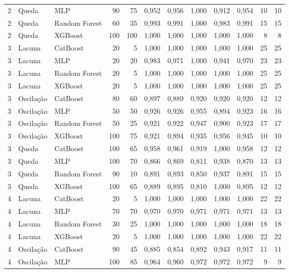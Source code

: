 \begin{longtable}{@{}rllrrrrrrrrr@{}}
2 & Queda & MLP & 90 & 75 & 0,952 & 0,956 & 1,000 & 0,912 & 0,954 & 10 & 10 \\
2 & Queda & Random Forest & 60 & 35 & 0,993 & 0,991 & 1,000 & 0,983 & 0,991 & 15 & 15 \\
2 & Queda & XGBoost & 100 & 100 & 1,000 & 1,000 & 1,000 & 1,000 & 1,000 & 8 & 8 \\
3 & Lacuna & CatBoost & 20 & 5 & 1,000 & 1,000 & 1,000 & 1,000 & 1,000 & 25 & 25 \\
3 & Lacuna & MLP & 20 & 20 & 0,983 & 0,971 & 1,000 & 0,941 & 0,970 & 23 & 23 \\
3 & Lacuna & Random Forest & 20 & 5 & 1,000 & 1,000 & 1,000 & 1,000 & 1,000 & 25 & 25 \\
3 & Lacuna & XGBoost & 20 & 5 & 1,000 & 1,000 & 1,000 & 1,000 & 1,000 & 25 & 25 \\
3 & Oscilação & CatBoost & 80 & 60 & 0,897 & 0,889 & 0,920 & 0,920 & 0,920 & 12 & 12 \\
3 & Oscilação & MLP & 50 & 50 & 0,926 & 0,926 & 0,955 & 0,894 & 0,923 & 16 & 16 \\
3 & Oscilação & Random Forest & 50 & 25 & 0,921 & 0,922 & 0,947 & 0,900 & 0,923 & 17 & 17 \\
3 & Oscilação & XGBoost & 100 & 75 & 0,921 & 0,894 & 0,935 & 0,956 & 0,945 & 10 & 10 \\
3 & Queda & CatBoost & 100 & 65 & 0,958 & 0,961 & 0,919 & 1,000 & 0,958 & 12 & 12 \\
3 & Queda & MLP & 100 & 70 & 0,866 & 0,869 & 0,811 & 0,938 & 0,870 & 13 & 13 \\
3 & Queda & Random Forest & 90 & 10 & 0,891 & 0,893 & 0,850 & 0,937 & 0,891 & 15 & 15 \\
3 & Queda & XGBoost & 100 & 65 & 0,889 & 0,895 & 0,810 & 1,000 & 0,895 & 12 & 12 \\
4 & Lacuna & CatBoost & 20 & 5 & 1,000 & 1,000 & 1,000 & 1,000 & 1,000 & 22 & 22 \\
4 & Lacuna & MLP & 70 & 70 & 0,970 & 0,970 & 0,971 & 0,971 & 0,971 & 13 & 13 \\
4 & Lacuna & Random Forest & 30 & 25 & 1,000 & 1,000 & 1,000 & 1,000 & 1,000 & 18 & 18 \\
4 & Lacuna & XGBoost & 20 & 5 & 1,000 & 1,000 & 1,000 & 1,000 & 1,000 & 22 & 22 \\
4 & Oscilação & CatBoost & 90 & 45 & 0,885 & 0,854 & 0,892 & 0,943 & 0,917 & 11 & 11 \\
4 & Oscilação & MLP & 100 & 85 & 0,964 & 0,960 & 0,972 & 0,972 & 0,972 & 9 & 9 \\

\end{longtable}
